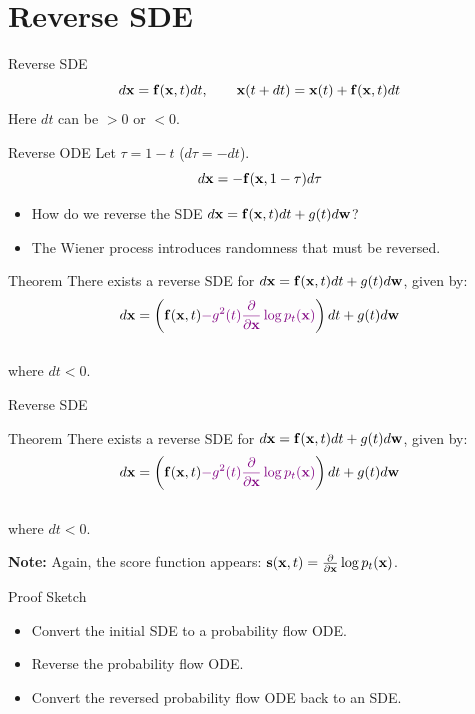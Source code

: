 \documentclass{beamer}
\renewcommand{\eqpause}{}
\begin{document}
\section{Reverse SDE}
\begin{frame}{Reverse SDE}
	\vspace{-0.3cm}
	\[
		d\mathbf{x} = \mathbf{f}(\mathbf{x}, t) dt,\qquad \mathbf{x}(t + dt) = \mathbf{x}(t) + \mathbf{f}(\mathbf{x}, t) dt
	\]
	Here $dt$ can be $>0$ or $<0$.
	\eqpause
	\begin{block}{Reverse ODE}
		Let $\tau = 1 - t$ ($d\tau = -dt$).
		\vspace{-0.3cm}
		\[
			d\mathbf{x} = - \mathbf{f}(\mathbf{x}, 1 - \tau) d\tau
		\]
	\end{block}
	\eqpause
	\vspace{-0.5cm}
	\begin{itemize}
		\item How do we reverse the SDE $d\mathbf{x} = \mathbf{f}(\mathbf{x}, t) dt + g(t) d \mathbf{w}$? 
		\item The Wiener process introduces randomness that must be reversed.
	\end{itemize}
	\eqpause
	\vspace{-0.3cm}
	\begin{block}{Theorem}
		There exists a reverse SDE for $d\mathbf{x} = \mathbf{f}(\mathbf{x}, t) dt + g(t) d \mathbf{w}$, given by:
		\vspace{-0.3cm}
		\[
			d\mathbf{x} = \left(\mathbf{f}(\mathbf{x}, t) {\color{violet}- g^2(t) \frac{\partial}{\partial \mathbf{x}}\log p_t(\mathbf{x})}\right) dt + g(t) d \mathbf{w}
		\]
		\vspace{-0.5cm}\\
		where $dt<0$.
	\end{block}
\end{frame}
\begin{frame}{Reverse SDE}
	\begin{block}{Theorem}
		There exists a reverse SDE for $d\mathbf{x} = \mathbf{f}(\mathbf{x}, t) dt + g(t) d \mathbf{w}$, given by:
		\vspace{-0.3cm}
		\[
			d\mathbf{x} = \left(\mathbf{f}(\mathbf{x}, t) {\color{violet}- g^2(t) \frac{\partial}{\partial \mathbf{x}}\log p_t(\mathbf{x})}\right) dt + g(t) d \mathbf{w}
		\]
		\vspace{-0.5cm}\\
		where $dt<0$.
	\end{block}
	\eqpause
	\textbf{Note:} Again, the score function appears: $\mathbf{s}(\mathbf{x}, t) = \frac{\partial}{\partial \mathbf{x}} \log p_t(\mathbf{x})$.
	\begin{block}{Proof Sketch}
		\begin{itemize}
			\item Convert the initial SDE to a probability flow ODE.
			\item Reverse the probability flow ODE.
			\item Convert the reversed probability flow ODE back to an SDE.
		\end{itemize}
	\end{block}
\end{frame}
\end{document}
